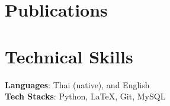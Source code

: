 \documentclass[letterpaper,11pt]{article}
\begin{document}
	
	\section{Publications}
	\nocite{*} %
	{%
		\justifying
		\printbibliography[heading=none, env=resumeitembib]
	}
	
	
	\section{Technical Skills}
	\begin{itemize}[leftmargin=0.15in, label={}]
		\small{\item{
				\textbf{Languages}{: Thai (native), and English} \\
				\textbf{Tech Stacks}{: Python, LaTeX, Git, MySQL}
		}}
	\end{itemize}
	
	
\end{document}
